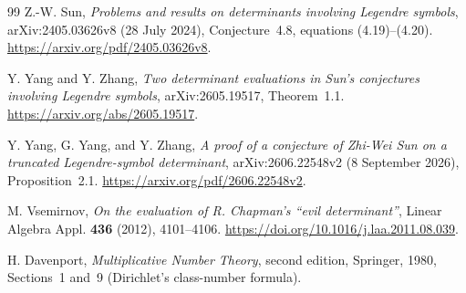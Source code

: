 \documentclass[11pt,a4paper]{article}
\theoremstyle{definition}
\theoremstyle{remark}
\begin{document}
\begin{thebibliography}{99}
Z.-W. Sun, \emph{Problems and results on determinants involving Legendre
symbols}, arXiv:2405.03626v8 (28 July 2024), Conjecture~4.8,
equations (4.19)--(4.20).
\url{https://arxiv.org/pdf/2405.03626v8}.

Y. Yang and Y. Zhang, \emph{Two determinant evaluations in Sun's
conjectures involving Legendre symbols}, arXiv:2605.19517,
Theorem~1.1.
\url{https://arxiv.org/abs/2605.19517}.

Y. Yang, G. Yang, and Y. Zhang, \emph{A proof of a conjecture of Zhi-Wei
Sun on a truncated Legendre-symbol determinant}, arXiv:2606.22548v2
(8 September 2026), Proposition~2.1.
\url{https://arxiv.org/pdf/2606.22548v2}.

M. Vsemirnov, \emph{On the evaluation of R. Chapman's ``evil
determinant''}, Linear Algebra Appl. \textbf{436} (2012), 4101--4106.
\url{https://doi.org/10.1016/j.laa.2011.08.039}.

H. Davenport, \emph{Multiplicative Number Theory}, second edition,
Springer, 1980, Sections~1 and~9 (Dirichlet's class-number formula).

\end{thebibliography}
\end{document}
